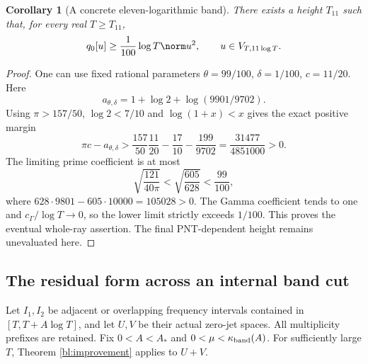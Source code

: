 \documentclass[11pt,a4paper]{article}
\numberwithin{equation}{section}
\newtheorem{corollary}[theorem]{Corollary}
\theoremstyle{definition}\newtheorem{definition}[theorem]{Definition}
\theoremstyle{remark}\newtheorem{remark}[theorem]{Remark}
\begin{document}
\begin{corollary}[A concrete eleven-logarithmic band]\label{bl:eleven}
There exists a height $T_{11}$ such that, for every real $T\ge T_{11}$,
\begin{equation}\label{bl:eleveneq}
 q_0[u]\ge\frac1{100}\log T\norm u^2,\qquad u\in V_{T,11\log T}.
\end{equation}
\end{corollary}
\begin{proof}
One can use fixed rational parameters $\theta=99/100$, $\delta=1/100$, $c=11/20$. Here
\begin{equation}
 a_{\theta,\delta}=1+\log2+\log(9901/9702).
\end{equation}
Using $\pi>157/50$, $\log2<7/10$ and $\log(1+x)<x$ gives the exact positive margin
\begin{equation}
 \pi c-a_{\theta,\delta}>
 \frac{157}{50}\frac{11}{20}-\frac{17}{10}-\frac{199}{9702}
 =\frac{31477}{4851000}>0.
\end{equation}
The limiting prime coefficient is at most
\begin{equation}
 \sqrt{\frac{121}{40\pi}}<\sqrt{\frac{605}{628}}<\frac{99}{100},
\end{equation}
where $628\cdot9801-605\cdot10000=105028>0$. The Gamma coefficient tends to one and $c_\Gamma/\log T\to0$, so the lower limit strictly exceeds $1/100$. This proves the eventual whole-ray assertion. The final PNT-dependent height remains unevaluated here.
\end{proof}

\subsection{The residual form across an internal band cut}\label{bl:sec:adjacent}
Let $I_1,I_2$ be adjacent or overlapping frequency intervals contained in $[T,T+A\log T]$, and let $U,V$ be their actual zero-jet spaces. All multiplicity prefixes are retained. Fix $0<A<A_*$ and $0<\mu<\kappa_{\rm band}(A)$. For sufficiently large $T$, Theorem \ref{bl:improvement} applies to $U+V$.
\end{document}

